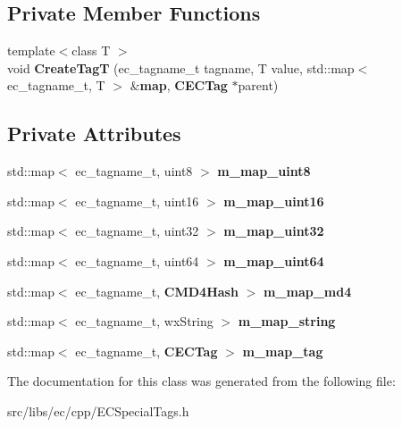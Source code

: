 \subsection*{Private Member Functions}
\begin{DoxyCompactItemize}
\item 
{\footnotesize template$<$class T $>$ }\\void {\bfseries CreateTagT} (ec\_\-tagname\_\-t tagname, T value, std::map$<$ ec\_\-tagname\_\-t, T $>$ \&{\bf map}, {\bf CECTag} $\ast$parent)\label{classCValueMap_a141ffd18e0d39f860a73e96a2bf2bbce}

\end{DoxyCompactItemize}
\subsection*{Private Attributes}
\begin{DoxyCompactItemize}
\item 
std::map$<$ ec\_\-tagname\_\-t, uint8 $>$ {\bfseries m\_\-map\_\-uint8}\label{classCValueMap_abe732238315fc2a87ce78894895b3723}

\item 
std::map$<$ ec\_\-tagname\_\-t, uint16 $>$ {\bfseries m\_\-map\_\-uint16}\label{classCValueMap_a1f1b47668bb61ae56f941352a5d1e9bd}

\item 
std::map$<$ ec\_\-tagname\_\-t, uint32 $>$ {\bfseries m\_\-map\_\-uint32}\label{classCValueMap_a90fb7a193a52c8e42cb2f91fb69c334b}

\item 
std::map$<$ ec\_\-tagname\_\-t, uint64 $>$ {\bfseries m\_\-map\_\-uint64}\label{classCValueMap_a19873112c81a396ae751d109c91a3d23}

\item 
std::map$<$ ec\_\-tagname\_\-t, {\bf CMD4Hash} $>$ {\bfseries m\_\-map\_\-md4}\label{classCValueMap_ad385da90c11fb0ba5c2e6aad8086d4ad}

\item 
std::map$<$ ec\_\-tagname\_\-t, wxString $>$ {\bfseries m\_\-map\_\-string}\label{classCValueMap_aee6c73fdbcc229bbd618733d33e087f3}

\item 
std::map$<$ ec\_\-tagname\_\-t, {\bf CECTag} $>$ {\bfseries m\_\-map\_\-tag}\label{classCValueMap_ae028d1016ccffd3293f5ee28d8d10048}

\end{DoxyCompactItemize}


The documentation for this class was generated from the following file:\begin{DoxyCompactItemize}
\item 
src/libs/ec/cpp/ECSpecialTags.h\end{DoxyCompactItemize}

